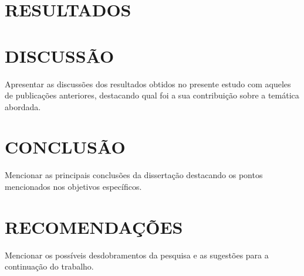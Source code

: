 \chapter{RESULTADOS}

\lipsum[1-2]

\chapter{DISCUSSÃO}

Apresentar as discussões dos resultados obtidos no presente estudo com aqueles de publicações anteriores, destacando qual foi a sua contribuição sobre a temática abordada.

\chapter{CONCLUSÃO}

Mencionar as principais conclusões da dissertação destacando os pontos mencionados nos objetivos específicos.

\chapter{RECOMENDAÇÕES}

Mencionar os possíveis desdobramentos da pesquisa e as sugestões para a continuação do trabalho.
